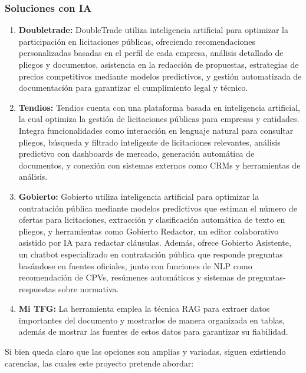 \documentclass{article}
\begin{document}
\subsubsection{Soluciones con IA}
\begin{enumerate}
    \item \textbf{Doubletrade:} DoubleTrade utiliza inteligencia artificial para optimizar la participación en licitaciones públicas, ofreciendo recomendaciones personalizadas basadas en el perfil de cada empresa, análisis detallado de pliegos y documentos, asistencia en la redacción de propuestas, estrategias de precios competitivos mediante modelos predictivos, y gestión automatizada de documentación para garantizar el cumplimiento legal y técnico.

    \item \textbf{Tendios:} Tendios cuenta con una plataforma basada en inteligencia artificial, la cual optimiza la gestión de licitaciones públicas para empresas y entidades. Integra funcionalidades como interacción en lenguaje natural para consultar pliegos, búsqueda y filtrado inteligente de licitaciones relevantes, análisis predictivo con dashboards de mercado, generación automática de documentos, y conexión con sistemas externos como CRMs y herramientas de análisis.
    
    \item \textbf{Gobierto:} 
    Gobierto utiliza inteligencia artificial para optimizar la contratación pública mediante modelos predictivos que estiman el número de ofertas para licitaciones, extracción y clasificación automática de texto en pliegos, y herramientas como Gobierto Redactor, un editor colaborativo asistido por IA para redactar cláusulas. Además, ofrece Gobierto Asistente, un chatbot especializado en contratación pública que responde preguntas basándose en fuentes oficiales, junto con funciones de NLP como recomendación de CPVs, resúmenes automáticos y sistemas de preguntas-respuestas sobre normativa.
    
    \item \textbf{Mi TFG:} 
    La herramienta emplea la técnica RAG para extraer datos importantes del documento y mostrarlos de manera organizada en tablas, además de mostrar las fuentes de estos datos para garantizar su fiabilidad. 

\end{enumerate}

Si bien queda claro que las opciones son amplias y variadas, siguen existiendo carencias, las cuales este proyecto pretende abordar:
\end{document}
